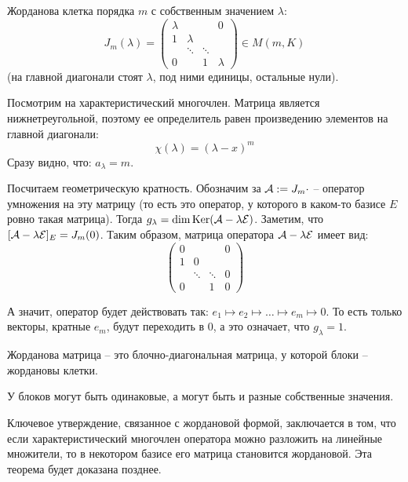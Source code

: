 \begin{conj}
    Жорданова клетка порядка $m$ с собственным значением $\lambda$: 
    \[ J_m(\lambda) = \left(\begin{array}{cccc}
    \lambda &  &  & 0 \\ 
    1 & \lambda &  &  \\ 
     & \ddots & \ddots &  \\ 
    0 &  & 1 & \lambda
    \end{array}\right) \in M(m, K) \]
    (на главной диагонали стоят $\lambda$, под ними единицы, остальные нули).
\end{conj}

\vspace*{3mm}

Посмотрим на характеристический многочлен.
Матрица является нижнетреугольной, поэтому ее определитель равен произведению элементов на главной диагонали:
    \[  \chi(\lambda) = (\lambda - x)^m \]
Сразу видно, что: $a_{\lambda} = m$.

Посчитаем геометрическую кратность. 
Обозначим за $\mathcal{A} := J_m \cdot$ -- оператор умножения на эту матрицу (то есть это оператор, у которого в каком-то базисе $E$ ровно такая матрица).
Тогда $ g_{\lambda} = \dim \operatorname{Ker}(\mathcal{A} - \lambda\mathcal{E})$. 
Заметим, что $[\mathcal{A} - \lambda\mathcal{E}]_E = J_{m}(0)$.
Таким образом, матрица оператора $\mathcal{A} - \lambda\mathcal{E}$ имеет вид:
\[ \left(\begin{array}{cccc}
0 &  &  & 0 \\
1 & 0 &  &  \\
 & \ddots & \ddots & 0 \\ 
0 &  & 1 & 0
\end{array}\right) \]

А значит, оператор будет действовать так: $e_1 \mapsto e_2 \mapsto \dots \mapsto e_m \mapsto 0$.
То есть только векторы, кратные $e_m$, будут переходить в 0, а это означает, что $g_\lambda = 1$.

\vspace*{4mm}

\begin{conj}
    Жорданова матрица -- это блочно-диагональная матрица, у которой блоки -- жордановы клетки.
\end{conj}
У блоков могут быть одинаковые, а могут быть и разные собственные значения.

Ключевое утверждение, связанное с жордановой формой, заключается в том, что 
если характеристический многочлен оператора можно разложить на линейные множители,
то в некотором базисе его матрица становится жордановой.
Эта теорема будет доказана позднее.

